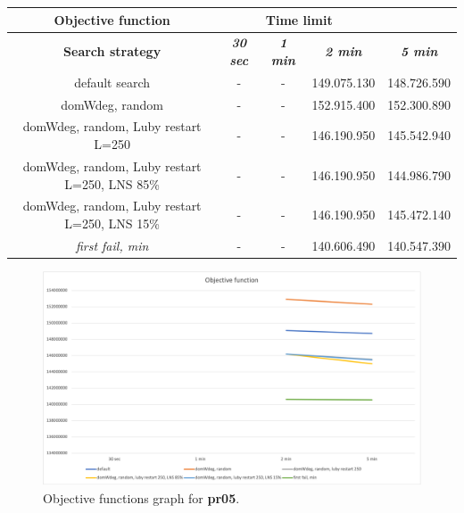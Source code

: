 {
\renewcommand{\arraystretch}{2}
\begin{longtable}[h]{| c | c | c | c | c |}
    \hline
    \textbf{Objective function} & \multicolumn{3}{c}{\textbf{Time limit}} & \\
    \hline
    \textbf{Search strategy} & \textbf{\textit{30 sec}} & \textbf{\textit{1 min}} & \textbf{\textit{2 min}} & \textbf{\textit{5 min}} \\
    \hline
    \endhead
    default search                                        & - & - & 149.075.130 & 148.726.590 \\
    \hline
    domWdeg, random                                       & - & - & 152.915.400 & 152.300.890 \\
    \hline
    domWdeg, random, Luby restart L=250                   & - & - & 146.190.950 & 145.542.940 \\
    \hline
    domWdeg, random, Luby restart L=250, LNS 85\%         & - & - & 146.190.950 & 144.986.790 \\
    \hline
    domWdeg, random, Luby restart L=250, LNS 15\%         & - & - & 146.190.950 & 145.472.140 \\
    \hline
    \textit{first fail, min}                              & - & - & 140.606.490 & 140.547.390 \\
    \hline
\end{longtable}
}
\begin{figure}[H]
    \centering
    \includegraphics[width=0.8\columnwidth]{../graphs/pr05-objf.png}
    \caption{Objective functions graph for \textbf{pr05}.}
\end{figure}

